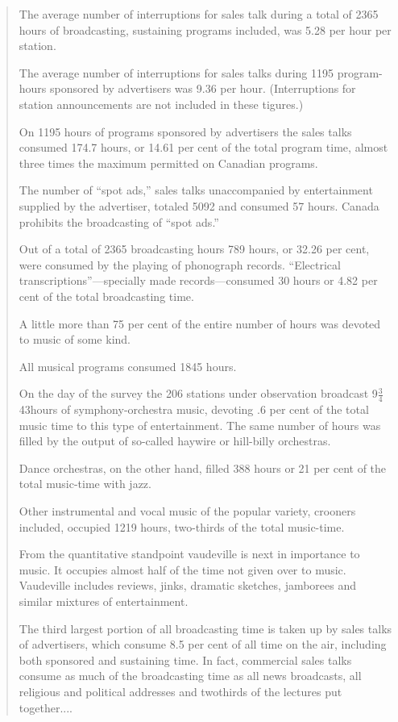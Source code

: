 \begin{quote}
The average number of interruptions for sales talk during a total of
2365 hours of broadcasting, sustaining programs included, was 5.28 per
hour per station.

The average number of interruptions for sales talks during 1195
program-hours sponsored by advertisers was 9.36 per hour. (Interruptions
for station announcements are not included in these tigures.)

On 1195 hours of programs sponsored by advertisers the sales talks
consumed 174.7 hours, or 14.61 per cent of the total program time,
almost three times the maximum permitted on Canadian programs.

The number of ``spot ads,'' sales talks unaccompanied by entertainment
supplied by the advertiser, totaled 5092 and consumed 57 hours. Canada
prohibits the broadcasting of ``spot ads.''

Out of a total of 2365 broadcasting hours 789 hours, or 32.26 per cent,
were consumed by the playing of phonograph records. ``Electrical
transcriptions''---specially made records---consumed 30 hours or 4.82
per cent of the total broadcasting time.

A little more than 75 per cent of the entire number of hours was devoted
to music of some kind.

All musical programs consumed 1845 hours.

On the day of the survey the 206 stations under observation broadcast
9{{{{\(\frac{3}{4}\)}{{{}{{}{{{{{{}{{{4}}}}{{}{}}{{}{{{3}}}}}{​}}{{{}}}}}{}}}}}}}
hours of symphony-orchestra music, devoting .6 per cent of the total
music time to this type of entertainment. The same number of hours was
filled by the output of so-called haywire or hill-billy orchestras.

Dance orchestras, on the other hand, filled 388 hours or 21 per cent of
the total music-time with jazz.

Other instrumental and vocal music of the popular variety, crooners
included, occupied 1219 hours, two-thirds of the total music-time.

From the quantitative standpoint vaudeville is next in importance to
music. It occupies almost half of the time not given over to music.
Vaudeville includes reviews, jinks, dramatic sketches, jamborees and
similar mixtures of entertainment.

The third largest portion of all broadcasting time is taken up by sales
talks of advertisers, which consume 8.5 per cent of all time on the air,
including both sponsored and sustaining time. In fact, commercial sales
talks consume as much of the broadcasting time as all news broadcasts,
all religious and political addresses and twothirds of the lectures put
together....


\end{quote}
